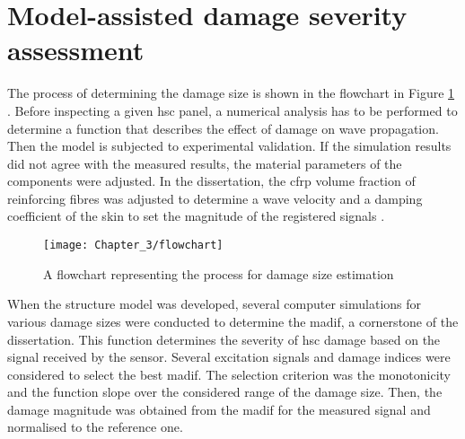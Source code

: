 \section{Model-assisted damage severity assessment}
\label{sec:madif}


The process of determining the damage size is shown in the flowchart in Figure \ref{fig:Flowchart} \cite{fiborek2021model}.
Before inspecting a given \ac{hsc} panel, a numerical analysis has to be performed to determine a function that describes the effect of damage on wave propagation.
Then the model is subjected to experimental validation.
If the simulation results did not agree with the measured results, the material parameters of the components were adjusted.
In the dissertation, the \ac{cfrp} volume fraction of reinforcing fibres was adjusted to determine a wave velocity \cite{kudela2007modelling} and a damping coefficient of the skin to set the magnitude of the registered signals \cite{wandowski2017guided}.
\begin{figure}[!tbh]
	\begin{center}
		\texttt{[image: Chapter\_3/flowchart]}
	\end{center}
	\caption{A flowchart representing the process for damage size estimation}
	\label{fig:Flowchart}
\end{figure}
\clearpage
When the structure model was developed, several computer simulations for various damage sizes were conducted to determine the \ac{madif}, a cornerstone of the dissertation. This function determines the severity of \ac{hsc} damage based on the signal received by the sensor.
Several excitation signals and damage indices were considered to select the best \ac{madif}.
The selection criterion was the monotonicity and the function slope over the considered range of the damage size. Then, the damage magnitude was obtained from the \ac{madif} for the measured signal and normalised to the reference one.